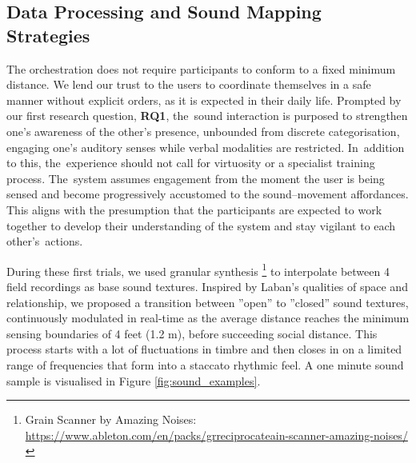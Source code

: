 \subsection*{Data Processing and Sound Mapping Strategies}
\label{sec:mapping}

The orchestration does not require participants to conform to a fixed minimum distance. We lend our trust to the users to coordinate themselves in a safe manner without explicit orders, as it is expected in their daily life. Prompted by our first research question, \textbf{RQ1}, the~sound interaction is purposed to strengthen one’s awareness of the other’s presence, unbounded from discrete categorisation, engaging one’s auditory senses while verbal modalities are restricted. In~addition to this, the~experience should not call for virtuosity or a specialist training process. The~system assumes engagement from the moment the user is being sensed and become progressively accustomed to the sound--movement affordances. This aligns with the presumption that the participants are expected to work together to develop their understanding of the system and stay vigilant to each other's~actions.

During these first trials, we used granular synthesis \footnote{{Grain Scanner
by Amazing Noises: \url{https://www.ableton.com/en/packs/grreciprocateain-scanner-amazing-noises/}}} to interpolate between 4 field recordings as base sound textures. Inspired by Laban’s qualities of space and relationship, we proposed a transition between ”open” to ”closed” sound textures, continuously modulated in real-time as the average distance reaches the minimum sensing boundaries of 4 feet (1.2 m), before succeeding social distance. This process starts with a lot of fluctuations in timbre and then closes in on a limited range of frequencies that form into a staccato rhythmic feel. A one minute sound sample is visualised in Figure \ref{fig:sound_examples}.

